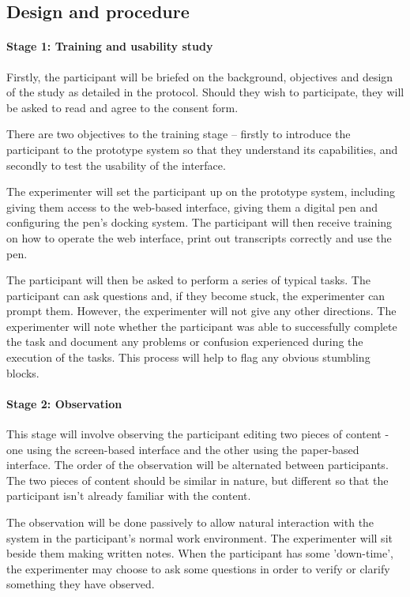 \subsection{Design and procedure}


\paragraph{Stage 1: Training and usability study}
Firstly, the participant will be briefed on the background, objectives and design of the study as detailed in the
protocol.  Should they wish to participate, they will be asked to read and agree to the consent form.

There are two objectives to the training stage – firstly to introduce the participant to the prototype system so that
they understand its capabilities, and secondly to test the usability of the interface.

The experimenter will set the participant up on the prototype system, including giving them access to the web-based
interface, giving them a digital pen and configuring the pen’s docking system. The participant will then receive
training on how to operate the web interface, print out transcripts correctly and use the pen.

The participant will then be asked to perform a series of typical tasks. The participant can ask questions and, if they
become stuck, the experimenter can prompt them. However, the experimenter will not give any other directions. The
experimenter will note whether the participant was able to successfully complete the task and document any problems or
confusion experienced during the execution of the tasks. This process will help to flag any obvious stumbling blocks.

\paragraph{Stage 2: Observation}

This stage will involve observing the participant editing two pieces of content - one using the screen-based interface
and the other using the paper-based interface. The order of the observation will be alternated between participants.
The two pieces of content should be similar in nature, but different so that the participant isn't already familiar
with the content.

The observation will be done passively to allow natural interaction with the system in the participant's normal work
environment. The experimenter will sit beside them making written notes. When the participant has some 'down-time', the
experimenter may choose to ask some questions in order to verify or clarify something they have observed.

